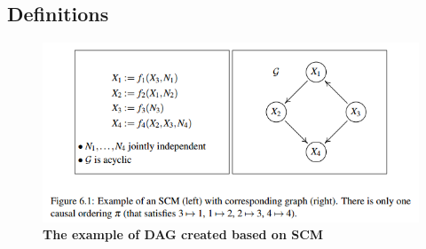 \documentclass[11pt]{article}
\begin{document}
\subsection{Definitions}
\begin{figure}
\begin{minipage}[t]{1\linewidth}
  \centering
  \centerline{\includegraphics[scale = 0.5]{scm_example.png}}
\end{minipage}
\caption{\footnotesize{\textbf{The example of DAG created based on SCM \citep{peters2017elements}}}}
\label{fig: scm_example}
\end{figure}
\end{document}
